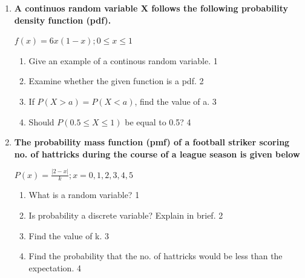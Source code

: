 \documentclass[a4paper,oneside]{book}
\begin{document}
\begin{enumerate}
  \begin{enumerate}
    \item
	What is a probability mass function? \hfill 1
    \item
	Can we dtermine the probability of a certain value of a discrete random variable? \hfill 2
    \item  
	What is the value of w? \hfill 3
    \item
	Which table is a proper probability distribution? Justify with mathematical reasoning. \hfill 4
  \end{enumerate}
  
   \item
	  \textbf{A continuos random variable X follows the following probability density function (pdf).} 
	  \begin{center}
	  $f(x) = 6x(1-x); 0\le x\le 1$
  \end{center}
  
  \begin{enumerate}
    \item
	Give an example of a continous random variable. \hfill 1
    \item
	Examine whether the given function is a pdf. \hfill 2
    \item  
	If $P(X>a) = P(X<a)$, find the value of a. \hfill 3
    \item
	Should $P(0.5 \le X \le 1)$  be equal to 0.5? \hfill 4
  \end{enumerate}
  
     \item
	  \textbf{The probability mass function (pmf) of a football striker scoring no. of hattricks during the course of a league season is given below}
	  
	  \begin{center}
	  $\displaystyle P(x)  = \frac{|2-x|}{k}; x = 0, 1, 2, 3, 4, 5$
	  \end{center}
  
  \begin{enumerate}
    \item
    What is a random variable? \hfill 1
    \item
		Is probability a discrete variable? Explain in brief. \hfill 2
    \item  
	Find the value of k.  \hfill 3
    \item
	Find the probability that the no. of hattricks would be less than the expectation. \hfill 4
  \end{enumerate}
  


\end{enumerate}
\end{document}
